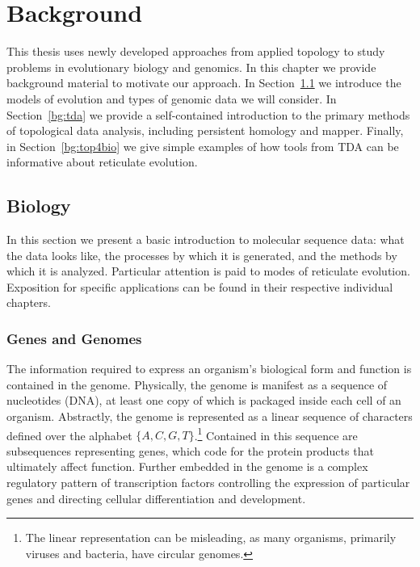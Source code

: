 \chapter{Background}
\label{ch:background}

This thesis uses newly developed approaches from applied topology to study problems in evolutionary biology and genomics.
In this chapter we provide background material to motivate our approach.
In Section~\ref{bg:bio} we introduce the models of evolution and types of genomic data we will consider.
In Section~\ref{bg:tda} we provide a self-contained introduction to the primary methods of topological data analysis, including persistent homology and mapper.
Finally, in Section~\ref{bg:top4bio} we give simple examples of how tools from TDA can be informative about reticulate evolution.

\section{Biology}
\label{bg:bio}

In this section we present a basic introduction to molecular sequence data: what the data looks like, the processes by which it is generated, and the methods by which it is analyzed.
Particular attention is paid to modes of reticulate evolution.
Exposition for specific applications can be found in their respective individual chapters.

\subsection{Genes and Genomes}
\label{bg:bio:genes}

The information required to express an organism's biological form and function is contained in the genome.
Physically, the genome is manifest as a sequence of nucleotides (DNA), at least one copy of which is packaged inside each cell of an organism.
Abstractly, the genome is represented as a linear sequence of characters defined over the alphabet $\{A,C,G,T\}$.\footnote{The linear representation can be misleading, as many organisms, primarily viruses and bacteria, have circular genomes.}
Contained in this sequence are subsequences representing genes, which code for the protein products that ultimately affect function.
Further embedded in the genome is a complex regulatory pattern of transcription factors controlling the expression of particular genes and directing cellular differentiation and development.

